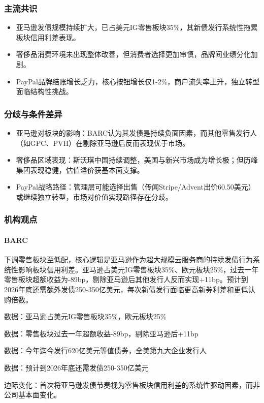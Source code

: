 \documentclass[11pt]{ctexart}
\begin{document}
\subsubsection*{主流共识}
\begin{itemize}
  \item 亚马逊发债规模持续扩大，已占美元IG零售板块35\%，其新债发行系统性拖累板块信用利差表现。
  \item 奢侈品消费环境未出现整体改善，但消费者选择更加审慎，品牌间业绩分化加剧。
  \item PayPal品牌结账增长乏力，核心按钮增长仅1-2\%，商户流失率上升，独立转型面临结构性挑战。
\end{itemize}
\subsubsection*{分歧与条件差异}
\begin{itemize}
  \item 亚马逊对板块的影响：BARC认为其发债是持续负面因素，而其他零售发行人（如GPC、PVH）在剔除亚马逊后反而表现优于市场。
  \item 奢侈品区域表现：斯沃琪中国持续调整，美国与新兴市场成为增长极；但历峰集团表现稳健，估值溢价获基本面支撑。
  \item PayPal战略路径：管理层可能选择出售（传闻Stripe/Advent出价60.50美元）或继续独立转型，市场对价值实现路径存在分歧。
\end{itemize}
\subsubsection*{机构观点}
\paragraph{BARC} 下调零售板块至低配，核心逻辑是亚马逊作为超大规模云服务商的持续发债行为系统性影响板块信用利差。亚马逊占美元IG零售板块35\%、欧元板块25\%，过去一年零售板块超额收益为-89bp，剔除亚马逊后其他发行人反而实现+11bp。预计到2026年底还需额外发债250-350亿美元，每次新债发行面临更高新券利差和更低认购倍数。
{\small\color{refgray}数据：亚马逊占美元IG零售板块35\%，欧元板块25\%\par}
{\small\color{refgray}数据：零售板块过去一年超额收益-89bp，剔除亚马逊后+11bp\par}
{\small\color{refgray}数据：今年迄今发行620亿美元等值债券，全美第九大企业发行人\par}
{\small\color{refgray}数据：预计到2026年底还需发债250-350亿美元\par}
{\small\color{refgray}边际变化：首次将亚马逊发债节奏视为零售板块信用利差的系统性驱动因素，而非公司基本面变化。\par}
\end{document}
